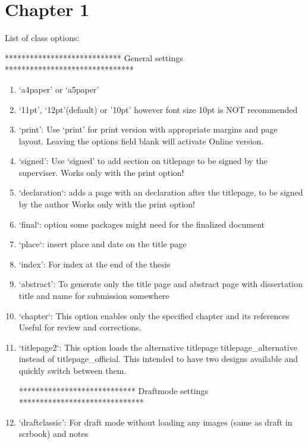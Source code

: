 \chapter{Chapter 1}\label{chap:chapter_1}
List of class options:

\quad ***************************** General settings *******************************
\begin{enumerate}
\item`a4paper' or `a5paper'

\item`11pt', `12pt'(default) or '10pt' however font size 10pt is NOT recommended

\item`print': Use `print' for print version with appropriate margins and page
 layout. Leaving the options field blank will activate Online version.

\item`signed': Use `signed' to add section on titlepage to be signed by the superviser.
 Works only with the print option!

\item`declaration`: adds a page with an declaration after the titlepage, to be signed by the author
 Works only with the print option!

\item`final`: option some packages might need for the finalized document

\item`place`: insert place and date on the title page

\item`index': For index at the end of the thesis

\item`abstract': To generate only the title page and abstract page with
 dissertation title and name for submission somewhere

\item`chapter`: This option enables only the specified chapter and its references
  Useful for review and corrections.

\item`titlepage2`: This option loads the alternative titlepage titlepage\_alternative instead of titlepage\_official. This intended to have two designs available and quickly switch between them.

 **************************** Draftmode settings ******************************
\item`draftclassic': For draft mode without loading any images (same as draft in scrbook) and notes


\end{enumerate}
